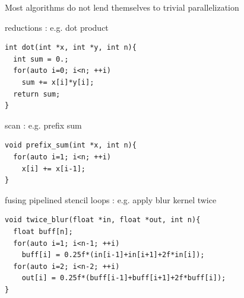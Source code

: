 
\begin{frame}[fragile]{}
    \centering
    Most algorithms do not lend themselves to trivial parallelization

    \begin{code}{reductions : e.g. dot product}
        \begin{lstlisting}[style=boxcudatiny]
int dot(int *x, int *y, int n){
  int sum = 0.;
  for(auto i=0; i<n; ++i)
    sum += x[i]*y[i];
  return sum;
}
        \end{lstlisting}
    \end{code}
\vspace{-7pt}
        \begin{code}{scan : e.g. prefix sum}
            \begin{lstlisting}[style=boxcudatiny]
void prefix_sum(int *x, int n){
  for(auto i=1; i<n; ++i)
    x[i] += x[i-1];
}
        \end{lstlisting}
    \end{code}
\vspace{-7pt}
    \begin{code}{fusing pipelined stencil loops : e.g. apply blur kernel twice}
        \begin{lstlisting}[style=boxcudatiny]
void twice_blur(float *in, float *out, int n){
  float buff[n];
  for(auto i=1; i<n-1; ++i)
    buff[i] = 0.25f*(in[i-1]+in[i+1]+2f*in[i]);
  for(auto i=2; i<n-2; ++i)
    out[i] = 0.25f*(buff[i-1]+buff[i+1]+2f*buff[i]);
}
        \end{lstlisting}
    \end{code}

\end{frame}

